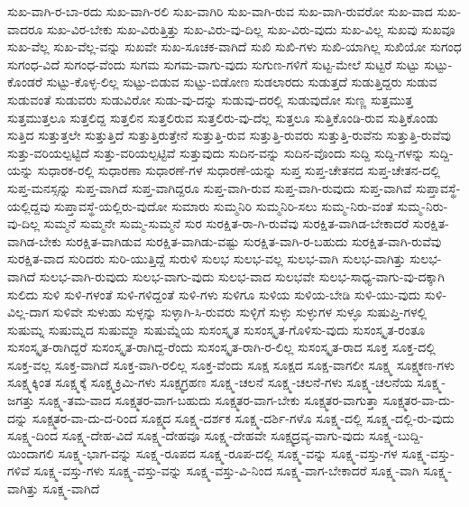 {ಸುಖ-ವಾಗಿ-ರ-ಬಾ-ರದು
ಸುಖ-ವಾಗಿ-ರಲಿ
ಸುಖ-ವಾಗಿರಿ
ಸುಖ-ವಾಗಿ-ರುವ
ಸುಖ-ವಾಗಿ-ರುವರೋ
ಸುಖ-ವಾದ
ಸುಖ-ವಾದರೂ
ಸುಖ-ವಿರ-ಬೇಕು
ಸುಖ-ವಿರುತ್ತಿತ್ತು
ಸುಖ-ವಿರು-ವು-ದಿಲ್ಲ
ಸುಖ-ವಿರು-ವುದು
ಸುಖ-ವಿಲ್ಲ
ಸುಖವು
ಸುಖವೂ
ಸುಖ-ವೆಲ್ಲ
ಸುಖ-ವೆಲ್ಲ-ವನ್ನು
ಸುಖವೇ
ಸುಖ-ಸೂಚಕ-ವಾಗಿದೆ
ಸುಖಿ
ಸುಖಿ-ಗಳು
ಸುಖಿ-ಯಾಗಿಲ್ಲ
ಸುಖಿಯೋ
ಸುಗಂಧ
ಸುಗಂಧ-ವಿದೆ
ಸುಗಂಧ-ವೆಂದು
ಸುಗಮ
ಸುಗಮ-ವಾಗು-ವುದು
ಸುಗುಣ-ಗಳಿಗೆ
ಸುಟ್ಟ-ಮೇಲೆ
ಸುಟ್ಟರೆ
ಸುಟ್ಟು
ಸುಟ್ಟು-ಕೊಂಡರೆ
ಸುಟ್ಟು-ಕೊಳ್ಳ-ಲಿಲ್ಲ
ಸುಟ್ಟು-ಬಿಡುವ
ಸುಟ್ಟು-ಬಿಡೋಣ
ಸುಡಲಾರದು
ಸುಡುತ್ತದೆ
ಸುಡುತ್ತಿದ್ದರು
ಸುಡುವ
ಸುಡುವಂತೆ
ಸುಡುವರು
ಸುಡುವಿರೋ
ಸುಡು-ವು-ದನ್ನು
ಸುಡುವು-ದರಲ್ಲಿ
ಸುಡುವುದೋ
ಸುಣ್ಣ
ಸುತ್ತಮುತ್ತ
ಸುತ್ತಮುತ್ತಲೂ
ಸುತ್ತಲಿದ್ದ
ಸುತ್ತಲಿನ
ಸುತ್ತಲಿರುವ
ಸುತ್ತಲಿರು-ವು-ದೆಲ್ಲ
ಸುತ್ತಲೂ
ಸುತ್ತಿಕೊಂಡಿ-ರುವ
ಸುತ್ತಿಕೊಂಡು
ಸುತ್ತಿದ
ಸುತ್ತುತ್ತಲೇ
ಸುತ್ತುತ್ತಿದೆ
ಸುತ್ತುತ್ತಿರುತ್ತೇನೆ
ಸುತ್ತುತ್ತಿ-ರುವ
ಸುತ್ತುತ್ತಿ-ರುವರು
ಸುತ್ತುತ್ತಿ-ರುವೆನು
ಸುತ್ತುತ್ತಿ-ರುವೆವು
ಸುತ್ತು-ವರಿಯಲ್ಪಟ್ಟಿದೆ
ಸುತ್ತು-ವರಿಯಲ್ಪಟ್ಟಿವೆ
ಸುತ್ತುವುದು
ಸುದಿನ-ವನ್ನು
ಸುದಿನ-ವೊಂದು
ಸುದ್ದಿ
ಸುದ್ದಿ-ಗಳನ್ನು
ಸುದ್ದಿ-ಯನ್ನು
ಸುಧಾರಕ-ರಲ್ಲಿ
ಸುಧಾರಣಾ
ಸುಧಾರಣೆ-ಗಳ
ಸುಧಾರಣೆ-ಯನ್ನು
ಸುಪ್ತ
ಸುಪ್ತ-ಚೇತನದ
ಸುಪ್ತ-ಚೇತನ-ದಲ್ಲಿ
ಸುಪ್ತ-ಮನಸ್ಸನ್ನು
ಸುಪ್ತ-ವಾಗಿದೆ
ಸುಪ್ತ-ವಾಗಿದ್ದರೂ
ಸುಪ್ತ-ವಾಗಿ-ರುವ
ಸುಪ್ತ-ವಾಗಿ-ರುವುದು
ಸುಪ್ತ-ವಾಗಿವೆ
ಸುಪ್ತಾವಸ್ಥೆ-ಯಲ್ಲಿದ್ದವು
ಸುಪ್ತಾವಸ್ಥೆ-ಯಲ್ಲಿರು-ವುದೋ
ಸುಮಾರು
ಸುಮ್ಮನಿರಿ
ಸುಮ್ಮನಿರಿ-ಸಲು
ಸುಮ್ಮ-ನಿರು-ವಂತೆ
ಸುಮ್ಮ-ನಿರು-ವು-ದಿಲ್ಲ
ಸುಮ್ಮನೆ
ಸುಮ್ಮನೇ
ಸುಮ್ಮ-ಸುಮ್ಮನೆ
ಸುರ
ಸುರಕ್ಷಿತ-ರಾ-ಗಿ-ರುವೆವು
ಸುರಕ್ಷಿತ-ವಾಗಿಡ-ಬೇಕಾದರೆ
ಸುರಕ್ಷಿತ-ವಾಗಿಡ-ಬೇಕು
ಸುರಕ್ಷಿತ-ವಾಗಿಡುವ
ಸುರಕ್ಷಿತ-ವಾಗಿಡು-ವಷ್ಟು
ಸುರಕ್ಷಿತ-ವಾಗಿ-ರ-ಬಹುದು
ಸುರಕ್ಷಿತ-ವಾಗಿ-ರುವೆವು
ಸುರಕ್ಷಿತ-ವಾದ
ಸುರಿದರು
ಸುರಿ-ಯುತ್ತಿದ್ದೆ
ಸುರುಳಿ
ಸುಲಭ
ಸುಲಭ-ವಲ್ಲ
ಸುಲಭ-ವಾಗಿ
ಸುಲಭ-ವಾಗಿತ್ತು
ಸುಲಭ-ವಾಗಿದೆ
ಸುಲಭ-ವಾಗಿ-ರುವುದು
ಸುಲಭ-ವಾಗು-ವುದು
ಸುಲಭ-ವಾದ
ಸುಲಭವೇ
ಸುಲಭ-ಸಾಧ್ಯ-ವಾಗು-ವು-ದಕ್ಕಾಗಿ
ಸುಲಿದು
ಸುಳಿ
ಸುಳಿ-ಗಳಂತೆ
ಸುಳಿ-ಗಳಿದ್ದಂತೆ
ಸುಳಿ-ಗಳು
ಸುಳಿಗೂ
ಸುಳಿಯ
ಸುಳಿಯ-ಬೇಡಿ
ಸುಳಿ-ಯು-ವುದು
ಸುಳಿ-ವಿಲ್ಲ-ದಾಗ
ಸುಳಿವೇ
ಸುಳುಹು
ಸುಳ್ಳನ್ನು
ಸುಳ್ಳಾಗಿ-ಸಿ-ರುವರು
ಸುಳ್ಳಿಗೆ
ಸುಳ್ಳು
ಸುಳ್ಳುಗಳ
ಸುಳ್ಳೂ
ಸುಷುಪ್ತಿ-ಗಳಲ್ಲಿ
ಸುಷುಮ್ನ
ಸುಷುಮ್ನದ
ಸುಷುಮ್ನಾ
ಸುಷುಮ್ನೆಯ
ಸುಸಂಸ್ಕೃತ
ಸುಸಂಸ್ಕೃತ-ಗೊಳಿಸು-ವುದು
ಸುಸಂಸ್ಕೃತ-ರಂತೂ
ಸುಸಂಸ್ಕೃತ-ರಾಗಿದ್ದರೆ
ಸುಸಂಸ್ಕೃತ-ರಾಗಿದ್ದ-ರೆಂದು
ಸುಸಂಸ್ಕೃತ-ರಾಗಿ-ರ-ಲಿಲ್ಲ
ಸುಸಂಸ್ಕೃತ-ರಾದ
ಸೂಕ್ತ
ಸೂಕ್ತ-ದಲ್ಲಿ
ಸೂಕ್ತ-ವಲ್ಲ
ಸೂಕ್ತ-ವಾಗಿದೆ
ಸೂಕ್ತ-ವಾಗಿ-ರಲಿಲ್ಲ
ಸೂಕ್ತ-ವೆಂದು
ಸೂಕ್ಷ
ಸೂಕ್ಷದ
ಸೂಕ್ಷ-ವಾಗಲೀ
ಸೂಕ್ಷ್ಮ
ಸೂಕ್ಷ್ಮಕಣ-ಗಳು
ಸೂಕ್ಷ್ಮಕ್ಕಿಂತ
ಸೂಕ್ಷ್ಮಕ್ಕೆ
ಸೂಕ್ಷ್ಮಕ್ರಿಮಿ-ಗಳು
ಸೂಕ್ಷ್ಮಗ್ರಹಣ
ಸೂಕ್ಷ್ಮ-ಚಲನೆ
ಸೂಕ್ಷ್ಮ-ಚಲನೆ-ಗಳು
ಸೂಕ್ಷ್ಮ-ಚಲನೆಯ
ಸೂಕ್ಷ್ಮ-ಜಗತ್ತು
ಸೂಕ್ಷ್ಮ-ತಮ-ವಾದ
ಸೂಕ್ಷ್ಮತರ-ವಾಗ-ಬಹುದು
ಸೂಕ್ಷ್ಮತರ-ವಾಗ-ಬೇಕು
ಸೂಕ್ಷ್ಮತರ-ವಾಗುತ್ತಾ
ಸೂಕ್ಷ್ಮತರ-ವಾ-ದು-ದನ್ನು
ಸೂಕ್ಷ್ಮತರ-ವಾ-ದು-ದ-ರಿಂದ
ಸೂಕ್ಷ್ಮದ
ಸೂಕ್ಷ್ಮ-ದರ್ಶಕ
ಸೂಕ್ಷ್ಮ-ದರ್ಶಿ-ಗಳೊ
ಸೂಕ್ಷ್ಮ-ದಲ್ಲಿ
ಸೂಕ್ಷ್ಮ-ದಲ್ಲಿ-ರು-ವುದು
ಸೂಕ್ಷ್ಮ-ದಿಂದ
ಸೂಕ್ಷ್ಮ-ದೇಹ-ವಿದೆ
ಸೂಕ್ಷ್ಮ-ದೇಹವೂ
ಸೂಕ್ಷ್ಮ-ದೇಹವೇ
ಸೂಕ್ಷ್ಮದ್ರವ್ಯ-ವಾಗು-ವುದು
ಸೂಕ್ಷ್ಮ-ಬುದ್ದಿ-ಯಿಂದಾಗಲಿ
ಸೂಕ್ಷ್ಮ-ಭಾಗ-ವನ್ನು
ಸೂಕ್ಷ್ಮ-ರೂಪದ
ಸೂಕ್ಷ್ಮ-ರೂಪ-ದಲ್ಲಿ
ಸೂಕ್ಷ್ಮ-ವನ್ನು
ಸೂಕ್ಷ್ಮ-ವಸ್ತು-ಗಳ
ಸೂಕ್ಷ್ಮ-ವಸ್ತು-ಗಳಿವೆ
ಸೂಕ್ಷ್ಮ-ವಸ್ತು-ಗಳು
ಸೂಕ್ಷ್ಮ-ವಸ್ತು-ವನ್ನು
ಸೂಕ್ಷ್ಮ-ವಸ್ತು-ವಿ-ನಿಂದ
ಸೂಕ್ಷ್ಮ-ವಾಗ-ಬೇಕಾದರೆ
ಸೂಕ್ಷ್ಮ-ವಾಗಿ
ಸೂಕ್ಷ್ಮ-ವಾಗಿತ್ತು
ಸೂಕ್ಷ್ಮ-ವಾಗಿದೆ
}
